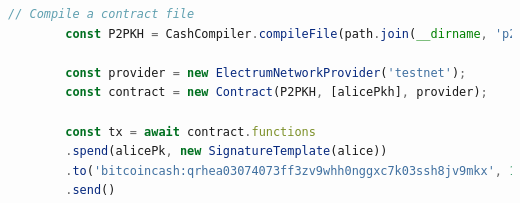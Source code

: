 \documentclass{cacthesis}
\begin{document}
        \begin{minipage}{\linewidth}
        \begin{lstlisting}[language=JavaScript, basicstyle=\footnotesize, caption= Compiling and executing CashScript \textit{P2PKH} via JavaScript , captionpos=b, backgroundcolor=\color{backcolour}, label=lst:cashScriptInUse]
        // Compile a contract file
        const P2PKH = CashCompiler.compileFile(path.join(__dirname, 'p2pkh.cash'));

        const provider = new ElectrumNetworkProvider('testnet');
        const contract = new Contract(P2PKH, [alicePkh], provider);
        
        const tx = await contract.functions
        .spend(alicePk, new SignatureTemplate(alice))
        .to('bitcoincash:qrhea03074073ff3zv9whh0nggxc7k03ssh8jv9mkx', 10000)
        .send()
        \end{lstlisting} 
	    \end{minipage}
	    
	    
\end{document}
